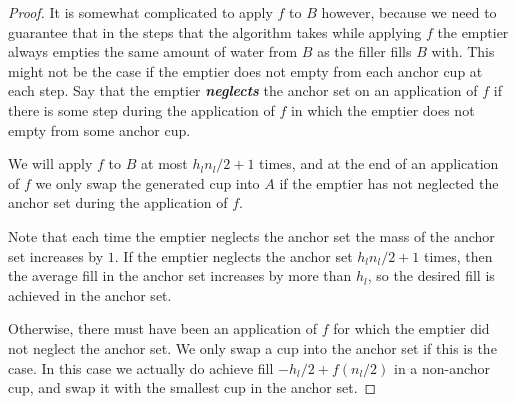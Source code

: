\documentclass[twocolumn]{article}[11pt]
\newcommand{\defn}[1]{{\textit{\textbf{\boldmath #1}}}}
\begin{document}
\begin{proof}
  It is somewhat complicated to apply $f$ to $B$ however, because we need to
  guarantee that in the steps that the algorithm takes while applying $f$ the
  emptier always empties the same amount of water from $B$ as the filler fills
  $B$ with. This might not be the case if the emptier does not empty from each
  anchor cup at each step. Say that the emptier \defn{neglects} the anchor set
  on an application of $f$ if there is some step during the application of $f$
  in which the emptier does not empty from some anchor cup.

  We will apply $f$ to $B$ at most $h_ln_l/2 + 1$ times, and at the end of an
  application of $f$ we only swap the generated cup into $A$ if the emptier has
  not neglected the anchor set during the application of $f$.

  Note that each time the emptier neglects the anchor set the mass of the
  anchor set increases by $1$. If the emptier neglects the anchor set $h_l
  n_l/2 + 1$ times, then the average fill in the anchor set increases by more
  than $h_l$, so the desired fill is achieved in the anchor set.

  Otherwise, there must have been an application of $f$ for which the emptier
  did not neglect the anchor set. We only swap a cup into the anchor set if
  this is the case. In this case we actually do achieve fill $-h_l/2 +
  f(n_l/2)$ in a non-anchor cup, and swap it with the smallest cup in the anchor set.
\end{proof}
\end{document}
